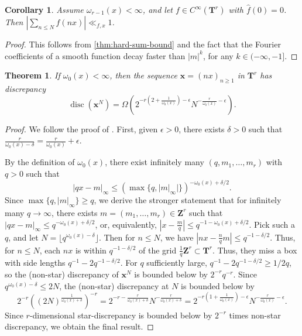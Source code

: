 \documentclass{article}
\DeclareMathOperator{\disc}{disc}
\newcommand{\bT}{\mathbf{T}}
\newcommand{\bx}{{\boldsymbol x}}
\newcommand{\bZ}{\mathbf{Z}}
\newtheorem{theorem}[subsection]{Theorem}
\newtheorem{corollary}[subsection]{Corollary}
\theoremstyle{definition}
\begin{document}
\begin{corollary}\label{cor:smooth-bounds}
Assume $\omega_{r-1}(x)<\infty$, and let $f\in C^\infty(\bT^r)$ with 
$\widehat f(0)=0$. Then $\left|\sum_{n\leqslant N} f(n x)\right| \ll_{f,x} 1$. 
\end{corollary}
\begin{proof}
This follows from \autoref{thm:hard-sum-bound} and the fact that the Fourier 
coefficients of a smooth function decay faster than $|m|^k$, for any 
$k\in (-\infty,-1]$. 
\end{proof}

\begin{theorem}\label{thm:discrepancy-lower-bound}
If $\omega_0(x)<\infty$, then the sequence $\bx=(n x)_{n\geqslant 1}$ in 
$\bT^r$ has discrepancy 
\[
	\disc(\bx^N) = \Omega\left(2^{-r\left(2+\frac{1}{\omega_0(x)}\right)-\epsilon} N^{-\frac{r}{\omega_0(x)}-\epsilon}\right) .
\]
\end{theorem}
\begin{proof}
We follow the proof of \cite[Ch.2, Th.3.3]{kuipers-niederreiter-1974}. First, 
given $\epsilon>0$, there exists $\delta>0$ such that 
$\frac{r}{\omega_0(x)-\delta} = \frac{r}{\omega_0(x)}+\epsilon$. 

By the definition of $\omega_0(x)$, there exist infinitely many 
$(q,m_1,\dots,m_r)$ with $q>0$ such that 
\[
	|q x-m|_\infty \leqslant (\max \{q,|m|_\infty|\})^{-\omega_0(x)+\delta/2} .	
\]
Since $\max\{q,|m|_\infty\}\geqslant q$, we derive the stronger statement 
that for infinitely many $q\to \infty$, there exists 
$m=(m_1,\dots,m_r)\in \bZ^r$ such that 
$|q x-m|_\infty \leqslant q^{-\omega_0(x)+\delta/2}$, or, equivalently, 
$|x-\frac{m}{q}| \leqslant q^{-1-\omega_0(x)+\delta/2}$. Pick such a $q$, and 
let $N=\lfloor q^{\omega_0(x)-\delta}\rfloor$. Then for $n\leqslant N$, we have 
$|n x-\frac n q m| \leqslant q^{-1-\delta/2}$. Thus, for $n\leqslant N$, each 
$n x$ is within $q^{-1-\delta/2}$ of the grid $\frac{1}{q} \bZ^r\subset \bT^r$. 
Thus, they miss a box with side lengths $q^{-1}-2 q^{-1-\delta/2}$. For 
$q$ sufficiently large, $q^{-1}-2 q^{-1-\delta/2} \geqslant 1/2q$, so the 
(non-star) discrepancy of $\bx^N$ is bounded below by $2^{-r} q^{-r}$. Since 
$q^{\omega_0(x)-\delta}\leqslant 2 N$, the (non-star) discrepancy at $N$ is 
bounded below by 
\[
	2^{-r} \left((2N)^{\frac{1}{\omega_0(x)+\delta}}\right)^{-r} = 2^{-r-\frac{r}{\omega_0(x)+\delta}} N^{-\frac{r}{\omega_0(x)+\delta}} = 2^{-r\left(1+\frac{1}{\omega_0(x)}\right)-\epsilon} N^{-\frac{r}{\omega_0(x)}-\epsilon} .
\]
Since $r$-dimensional star-discrepancy is bounded below by 
$2^{-r}$ times non-star discrepancy, we obtain the final result.
\end{proof}
\end{document}
